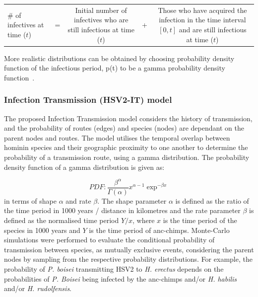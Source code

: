 \documentclass[fleqn,10pt]{wlscirep}
\begin{document}
\begin{table}[!h]
	\centering
	\renewcommand{\arraystretch}{1.5}
	\begin{tabulary}{\linewidth}{LCCCC}
		\# of infectives at time ($t$) & =  & 
		Initial number of infectives who are still infectious at time ($t$) & + & 
		Those who have acquired the infection in the time interval $[0, t]$ and are still infectious at time ($t$)			\\ 
	\end{tabulary}
\end{table}

More realistic distributions can be obtained by choosing  probability density function of the infectious period,  p(t) to be a gamma probability density function~\citep{Blythe1988,Lloyd2001}.

\subsubsection*{Infection Transmission (HSV2-IT) model}
The proposed Infection Transmission model considers the history of transmission, and the probability of routes (edges) and species (nodes) are dependant on the parent nodes and routes. The model utilises the temporal overlap between hominin species and their geographic proximity to one another to determine the probability of a transmission route, using a gamma distribution.  The probability density function of a gamma distribution is given as:

\begin{equation}
PDF:\frac{\beta^\alpha}{\Gamma(\alpha)}x^{\alpha - 1} \exp^{-\beta x}
\end{equation}
in terms of shape $\alpha$ and rate $\beta$. The shape parameter $\alpha$ is defined as the ratio of the time period in 1000 years / distance in kilometres and the rate parameter $\beta$ is defined as the normalised time period $Y / x$, where $x$ is the time period of the species in 1000 years and $Y$ is the time period of anc-chimps. Monte-Carlo simulations were performed to evaluate the conditional probability of transmission between species, as mutually exclusive events, considering the parent nodes by sampling from the respective probability distributions. For example, the probability of \textit{P. boisei} transmitting HSV2 to \textit{H. erectus} depends on the probabilities of \textit{P. Boisei} being infected by the anc-chimps and/or \textit{H. habilis} and/or \textit{H. rudolfensis}.
\end{document}
